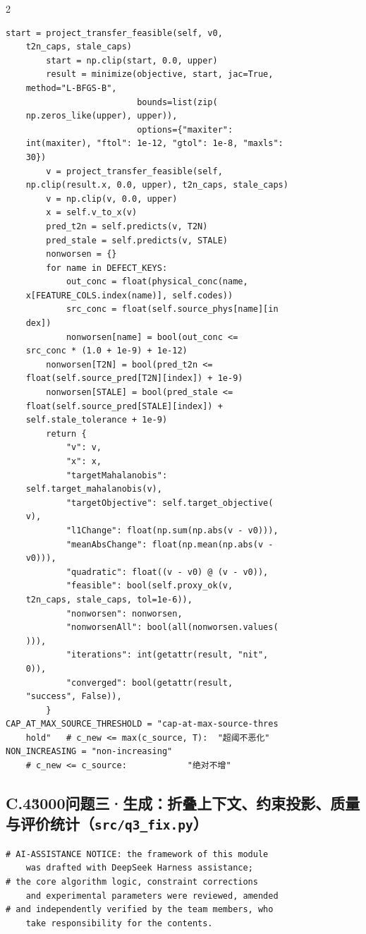 \begin{multicols}{2}
\begin{Verbatim}[fontsize=\scriptsize]
        start = project_transfer_feasible(self, v0,
    t2n_caps, stale_caps)
        start = np.clip(start, 0.0, upper)
        result = minimize(objective, start, jac=True,
    method="L-BFGS-B",
                          bounds=list(zip(
    np.zeros_like(upper), upper)),
                          options={"maxiter":
    int(maxiter), "ftol": 1e-12, "gtol": 1e-8, "maxls":
    30})
        v = project_transfer_feasible(self,
    np.clip(result.x, 0.0, upper), t2n_caps, stale_caps)
        v = np.clip(v, 0.0, upper)
        x = self.v_to_x(v)
        pred_t2n = self.predicts(v, T2N)
        pred_stale = self.predicts(v, STALE)
        nonworsen = {}
        for name in DEFECT_KEYS:
            out_conc = float(physical_conc(name,
    x[FEATURE_COLS.index(name)], self.codes))
            src_conc = float(self.source_phys[name][in
    dex])
            nonworsen[name] = bool(out_conc <=
    src_conc * (1.0 + 1e-9) + 1e-12)
        nonworsen[T2N] = bool(pred_t2n <=
    float(self.source_pred[T2N][index]) + 1e-9)
        nonworsen[STALE] = bool(pred_stale <=
    float(self.source_pred[STALE][index]) +
    self.stale_tolerance + 1e-9)
        return {
            "v": v,
            "x": x,
            "targetMahalanobis":
    self.target_mahalanobis(v),
            "targetObjective": self.target_objective(
    v),
            "l1Change": float(np.sum(np.abs(v - v0))),
            "meanAbsChange": float(np.mean(np.abs(v -
    v0))),
            "quadratic": float((v - v0) @ (v - v0)),
            "feasible": bool(self.proxy_ok(v,
    t2n_caps, stale_caps, tol=1e-6)),
            "nonworsen": nonworsen,
            "nonworsenAll": bool(all(nonworsen.values(
    ))),
            "iterations": int(getattr(result, "nit",
    0)),
            "converged": bool(getattr(result,
    "success", False)),
        }
CAP_AT_MAX_SOURCE_THRESHOLD = "cap-at-max-source-thres
    hold"   # c_new <= max(c_source, T):  "超阈不恶化"
NON_INCREASING = "non-increasing"
    # c_new <= c_source:            "绝对不增"
\end{Verbatim}

\subsection*{C.4\u3000问题三·生成：折叠上下文、约束投影、质量与评价统计（\texttt{src/q3\_fix.py}）}
\begin{Verbatim}[fontsize=\scriptsize]
# AI-ASSISTANCE NOTICE: the framework of this module
    was drafted with DeepSeek Harness assistance;
# the core algorithm logic, constraint corrections
    and experimental parameters were reviewed, amended
# and independently verified by the team members, who
    take responsibility for the contents.


\end{Verbatim}
\end{multicols}
